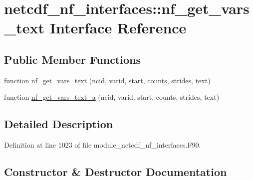 \hypertarget{interfacenetcdf__nf__interfaces_1_1nf__get__vars__text}{}\section{netcdf\+\_\+nf\+\_\+interfaces\+:\+:nf\+\_\+get\+\_\+vars\+\_\+text Interface Reference}
\label{interfacenetcdf__nf__interfaces_1_1nf__get__vars__text}
\subsection*{Public Member Functions}
\begin{DoxyCompactItemize}
\item 
function \hyperlink{interfacenetcdf__nf__interfaces_1_1nf__get__vars__text_a0934b8db611892747438ce758e817ed6}{nf\+\_\+get\+\_\+vars\+\_\+text} (ncid, varid, start, counts, strides, text)
\item 
function \hyperlink{interfacenetcdf__nf__interfaces_1_1nf__get__vars__text_a960b35b1ab5f8b6fd472da3804bf9366}{nf\+\_\+get\+\_\+vars\+\_\+text\+\_\+a} (ncid, varid, start, counts, strides, text)
\end{DoxyCompactItemize}


\subsection{Detailed Description}


Definition at line 1023 of file module\+\_\+netcdf\+\_\+nf\+\_\+interfaces.\+F90.



\subsection{Constructor \& Destructor Documentation}
\mbox{\label{interfacenetcdf__nf__interfaces_1_1nf__get__vars__text_a0934b8db611892747438ce758e817ed6}} 
